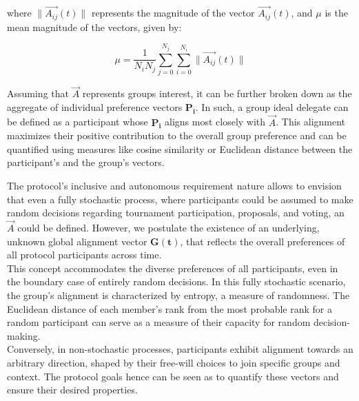 \documentclass{article}
\begin{document}
\begin{CJK}{UTF8}{gbsn}
\begin{multicols}{2}
        where $\|\vec{A_{ij}}(t)\|$ represents the magnitude of the vector $\vec{A_{ij}}(t)$, and $\mu$ is the mean magnitude of the vectors, given by:

        \begin{equation}
            \mu = \frac{1}{N_{i}N_{j}} \sum_{j=0}^{N_{j}} \sum_{i=0}^{N_{i}} \|\vec{A_{ij}}(t)\|
        \end{equation}

        Assuming that $\vec{A}$ represents groups interest, it can be further broken down as the aggregate of individual preference vectors $\mathbf{P_i}$. In such, a group ideal delegate can be defined as a participant whose $\mathbf{P_i}$ aligns most closely with $\vec{A}$.
        This alignment maximizes their positive contribution to the overall group preference and can be quantified using measures like cosine similarity or Euclidean distance between the participant's and the group's vectors.

        The protocol's inclusive and autonomous requirement nature allows to envision that even a fully stochastic process, where participants could be assumed to make random decisions regarding tournament participation, proposals, and voting, an $\vec{A}$ could be defined.
        However, we postulate the existence of an underlying, unknown global alignment vector $\mathbf{G(t)}$, that reflects the overall preferences of all protocol participants across time. \\
        This concept accommodates the diverse preferences of all participants, even in the boundary case of entirely random decisions.
        In this fully stochastic scenario, the group's alignment is characterized by entropy, a measure of randomness. The Euclidean distance of each member's rank from the most probable rank for a random participant can serve as a measure of their capacity for random decision-making. \\
        Conversely, in non-stochastic processes, participants exhibit alignment towards an arbitrary direction, shaped by their free-will choices to join specific groups and context. The protocol goals hence can be seen as to quantify these vectors and ensure their desired properties.



\end{multicols}
\end{CJK}
\end{document}

